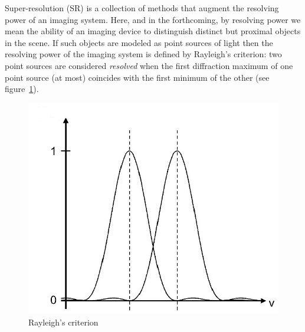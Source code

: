 Super-resolution (SR) is a collection of methods that augment the resolving power of an imaging system.
%
Here, and in the forthcoming, by resolving power we mean the ability of an imaging device to distinguish distinct but proximal objects in the scene.
%
If such objects are modeled as point sources of light then the resolving power of the imaging system is defined by Rayleigh's criterion: two point sources are considered \textit{resolved} when the first diffraction maximum of one point source (at most) coincides with the first minimum of the other (see figure~\ref{fig:rayleigh}).
\begin{figure}
    \center
    \includegraphics[width=.5\linewidth]{figures/rayleigh.png}
    \caption{Rayleigh's criterion\cite{rayleigh}}
    \label{fig:rayleigh}
\end{figure}

